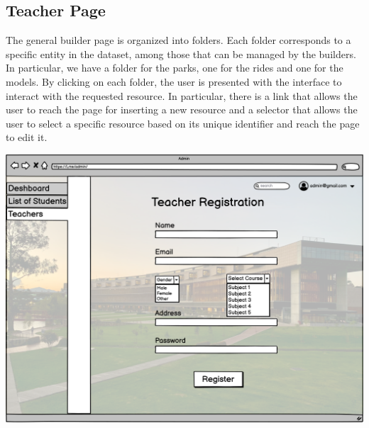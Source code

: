 \subsection{Teacher Page}
The general builder page is organized into folders. Each folder corresponds to a specific entity in the dataset, among those that can be managed by the builders. In particular, we have a folder for the parks, one for the rides and one for the models. By clicking on each folder, the user is presented with the interface to interact with the requested resource. In particular, there is a link that allows the user to reach the page for inserting a new resource and a selector that allows the user to select a specific resource based on its unique identifier and reach the page to edit it.

\includegraphics[width=\columnwidth]{images/TeacherRegistration.png}